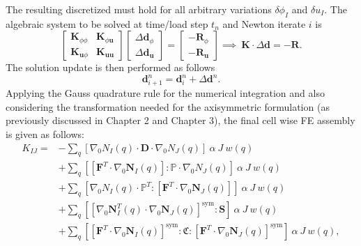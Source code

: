 The resulting discretized  must hold for all arbitrary variations $\delta \phi_I$ and $\delta u_I$. The algebraic system to be solved at time/load step $t_n$ and Newton iterate $i$ is
\begin{equation}
\begin{bmatrix}
\mathbf{K}_{\phi \phi} & \mathbf{K}_{\phi \mathbf{u}} \\
\mathbf{K}_{\mathbf{u} \phi} & \mathbf{K}_{\mathbf{u} \mathbf{u}}
\end{bmatrix}
\begin{bmatrix}
\Delta \mathbf{d}_{\phi} \\
\Delta \mathbf{d}_{\mathbf{u}}
\end{bmatrix}
=
\begin{bmatrix}
-\mathbf{R}_{\phi} \\
-\mathbf{R}_{\mathbf{u}}
\end{bmatrix}
\implies \ \mathbf{K} \cdot \Delta \mathbf{d} = -\mathbf{R}.
\label{eq:3.10}
\end{equation}
The solution update is then performed as follows
\begin{equation}
\mathbf{d}_{i+1}^n = \mathbf{d}_i^n + \Delta \mathbf{d}^n.
\label{eq:3.38}
\end{equation}
Applying the Gauss quadrature rule for the numerical integration and also considering the transformation needed for the axisymmetric formulation (as previously discussed in Chapter 2 and Chapter 3), the final cell wise FE assembly is given as follows:
\begin{align}
K_{IJ} = &- \sum\limits_q \left[ \nabla_0 N_I (q) \cdot \mathbf{D} \cdot \nabla_0 N_J (q) \right] \ \alpha \ J \ w(q) \nonumber \\
&+ \sum\limits_q \left[ \left[ \mathbf{F}^T \cdot \nabla_0 \mathbf{N}_I (q) \right] : \mathbb{P} \cdot \nabla_0 N_J (q) \right] \ \alpha \ J \ w(q) \nonumber \\
&+ \sum\limits_q \left[ \nabla_0 N_I (q) \cdot \mathbb{P}^T : \left[ \mathbf{F}^T \cdot \nabla_0 \mathbf{N}_J (q) \right] \right] \ \alpha \ J \ w(q) \nonumber \\
&+ \sum\limits_q \left[ \left[ \nabla_0 \mathbf{N}_I^T (q) \cdot \nabla_0 \mathbf{N}_J (q) \right]^{\text{sym}} : \mathbf{S} \right]  \ \alpha \ J \ w(q) \nonumber \\
&+ \sum\limits_q \left[ \left[ \mathbf{F}^T \cdot \nabla_0 \mathbf{N}_I (q) \right]^{\text{sym}} : \mathfrak{C} : \left[ \mathbf{F}^T \cdot \nabla_0 \mathbf{N}_J (q) \right]^{\text{sym}} \right] \ \alpha \ J \ w(q),
\label{eq:3.39}
\end{align}
